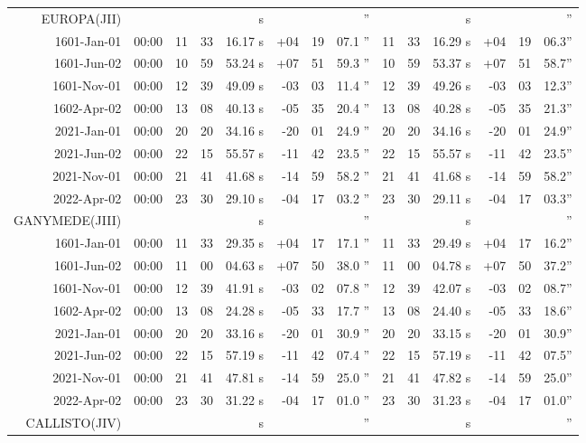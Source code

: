 \begin{longtable}{r@{\,}r|r@{h\,}r@{m\,}r<{s}|r@{°\,}r@{'\,}r<{''}||r@{h\,}r@{m\,}r<{s}|r@{°\,}r@{'\,}r<{''}}
EUROPA(JII)      \\
 1601-Jan-01 & 00:00  &   11 & 33 & 16.17 & +04 & 19 & 07.1 & 11&33&16.29 & +04&19&06.3\\ %
 1601-Jun-02 & 00:00  &   10 & 59 & 53.24 & +07 & 51 & 59.3 & 10&59&53.37 & +07&51&58.7\\ %
 1601-Nov-01 & 00:00  &   12 & 39 & 49.09 & -03 & 03 & 11.4 & 12&39&49.26 & -03&03&12.3\\ %
 1602-Apr-02 & 00:00  &   13 & 08 & 40.13 & -05 & 35 & 20.4 & 13&08&40.28 & -05&35&21.3\\ %
 2021-Jan-01 & 00:00  &   20 & 20 & 34.16 & -20 & 01 & 24.9 & 20&20&34.16 & -20&01&24.9\\ %
 2021-Jun-02 & 00:00  &   22 & 15 & 55.57 & -11 & 42 & 23.5 & 22&15&55.57 & -11&42&23.5\\ %
 2021-Nov-01 & 00:00  &   21 & 41 & 41.68 & -14 & 59 & 58.2 & 21&41&41.68 & -14&59&58.2\\ %
 2022-Apr-02 & 00:00  &   23 & 30 & 29.10 & -04 & 17 & 03.2 & 23&30&29.11 & -04&17&03.3\\ %
GANYMEDE(JIII)\\
 1601-Jan-01 & 00:00  &   11 & 33 & 29.35 & +04 & 17 & 17.1 & 11&33&29.49 & +04&17&16.2\\ %
 1601-Jun-02 & 00:00  &   11 & 00 & 04.63 & +07 & 50 & 38.0 & 11&00&04.78 & +07&50&37.2\\ %
 1601-Nov-01 & 00:00  &   12 & 39 & 41.91 & -03 & 02 & 07.8 & 12&39&42.07 & -03&02&08.7\\ %
 1602-Apr-02 & 00:00  &   13 & 08 & 24.28 & -05 & 33 & 17.7 & 13&08&24.40 & -05&33&18.6\\ %
 2021-Jan-01 & 00:00  &   20 & 20 & 33.16 & -20 & 01 & 30.9 & 20&20&33.15 & -20&01&30.9\\ %
 2021-Jun-02 & 00:00  &   22 & 15 & 57.19 & -11 & 42 & 07.4 & 22&15&57.19 & -11&42&07.5\\ %
 2021-Nov-01 & 00:00  &   21 & 41 & 47.81 & -14 & 59 & 25.0 & 21&41&47.82 & -14&59&25.0\\ %
 2022-Apr-02 & 00:00  &   23 & 30 & 31.22 & -04 & 17 & 01.0 & 23&30&31.23 & -04&17&01.0\\ %
CALLISTO(JIV) \\                                                                          

\end{longtable}

